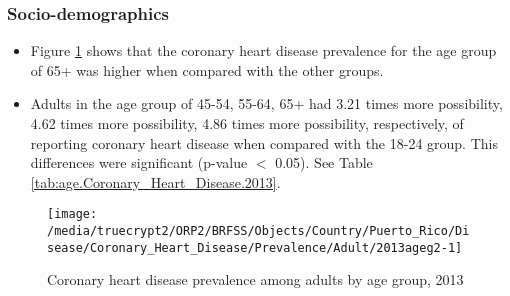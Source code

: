 
\newpage
\subsubsection{Socio-demographics}

\begin{itemize}

\item Figure \ref{fig:age.Coronary_Heart_Disease.2013} shows that the coronary heart disease prevalence for the age group of
65+
was higher when compared with the other groups.

\item Adults in the age group of 45-54, 55-64, 65+ had 3.21 times more possibility, 4.62 times more possibility, 4.86 times more possibility, respectively, of reporting coronary heart disease when compared with the 18-24 group. This differences were significant (p-value $<$ 0.05). See Table \ref{tab:age.Coronary_Heart_Disease.2013}.


\end{itemize}


\begin{figure}[H]
\caption{Coronary heart disease prevalence among adults by age group, 
2013}
\begin{knitrout}
\color{fgcolor}

{\centering \texttt{[image: /media/truecrypt2/ORP2/BRFSS/Objects/Country/Puerto\_Rico/Disease/Coronary\_Heart\_Disease/Prevalence/Adult/2013ageg2-1]} 

}



\end{knitrout}
\label{fig:age.Coronary_Heart_Disease.2013}
\end{figure}

